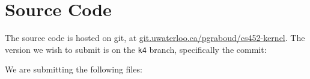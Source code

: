 \documentclass[titlepage]{article}
\begin{document}
\section{Source Code}
The source code is hosted on git, at \url{git.uwaterloo.ca/pgraboud/cs452-kernel}.
The version we wish to submit is on the \texttt{k4} branch, specifically
the commit:

We are submitting the following files:


\end{document}

